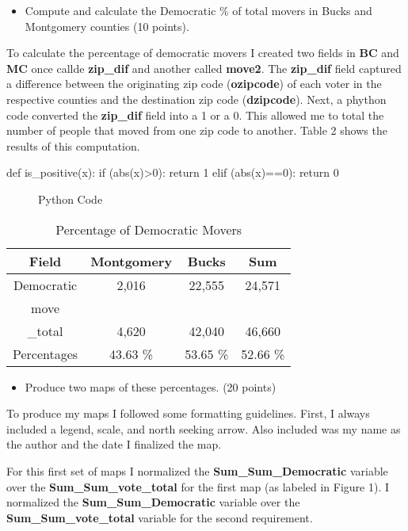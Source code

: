 \documentclass[12pt]{article}
\begin{document}
\begin{itemize}
	\item Compute and calculate the Democratic \% of total movers in Bucks and Montgomery counties (10 points).
\end{itemize}

To calculate the percentage of democratic movers I created two fields in \textbf{BC} and \textbf{MC} once callde \textbf{zip\_dif} and another called \textbf{move2}.  The \textbf{zip\_dif} field captured a difference between the originating zip code (\textbf{ozipcode}) of each voter in the respective counties and the destination zip code (\textbf{dzipcode}).  Next, a phython code converted the \textbf{zip\_dif} field into a 1 or a 0.  This allowed me to total the number of people that moved from one zip code to another.  Table 2 shows the results of this computation.  

\begin{verbbox}
def is\_positive(x):
if (abs(x)>0):
return 1
elif (abs(x)==0):
return 0 
\end{verbbox}
\begin{figure}[ht]
	\centering
	\theverbbox
	\caption{Python Code}
\end{figure}


\begin{table}[]
\centering
\caption{Percentage of Democratic Movers}
\label{my-label}
\begin{tabular}{cccc}
Field       & Montgomery & Bucks    & Sum      \\
\hline
Democratic  & 2,016      & 22,555   & 24,571   \\
move\\\_total & 4,620      & 42,040   & 46,660   \\
\hline
\hline
Percentages & 43.63 \%   & 53.65 \% & 52.66 \%
\end{tabular}
\end{table}

\begin{itemize}
	\item Produce two maps of these percentages. (20 points)
\end{itemize}

To produce my maps I followed some formatting guidelines.  First, I always included a legend, scale, and north seeking arrow.  Also included was my name as the author and the date I finalized the map.  

For this first set of maps I normalized the \textbf{Sum\_Sum\_Democratic} variable over the \textbf{Sum\_Sum\_vote\_total} for the first map (as labeled in Figure 1).  I normalized the \textbf{Sum\_Sum\_Democratic} variable over the \textbf{Sum\_Sum\_vote\_total} variable for the second requirement.  
\end{document}

